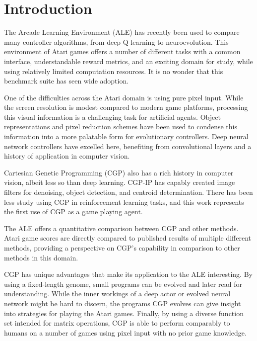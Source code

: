 \documentclass[sigconf,screen]{acmart}\settopmatter{printfolios=true,printacmref=false}
\begin{document}

\maketitle

\section{Introduction}
\label{sec:intro}

The Arcade Learning Environment (ALE) \cite{bellemare13arcade} has recently been
used to compare many controller algorithms, from deep Q learning to
neuroevolution. This environment of Atari games offers a number of different
tasks with a common interface, understandable reward metrics, and an exciting
domain for study, while using relatively limited computation resources. It is no
wonder that this benchmark suite has seen wide adoption.

One of the difficulties across the Atari domain is using pure pixel input. While
the screen resolution is modest compared to modern game platforms, processing
this visual information is a challenging task for artificial agents. Object
representations and pixel reduction schemes have been used to condense this
information into a more palatable form for evolutionary controllers. Deep neural
network controllers have excelled here, benefiting from convolutional layers and
a history of application in computer vision.

Cartesian Genetic Programming (CGP) also has a rich history in computer vision,
albeit less so than deep learning. CGP-IP has capably created image filters for
denoising, object detection, and centroid determination. There has been less
study using CGP in reinforcement learning tasks, and this work represents the
first use of CGP as a game playing agent.

The ALE offers a quantitative comparison between CGP and other methods. Atari
game scores are directly compared to published results of multiple different
methods, providing a perspective on CGP's capability in comparison to other
methods in this domain.

CGP has unique advantages that make its application to the ALE interesting. By
using a fixed-length genome, small programs can be evolved and later read for
understanding. While the inner workings of a deep actor or evolved neural
network might be hard to discern, the programs CGP evolves can give insight into
strategies for playing the Atari games. Finally, by using a diverse function set
intended for matrix operations, CGP is able to perform comparably to humans on a
number of games using pixel input with no prior game knowledge.
\end{document}
